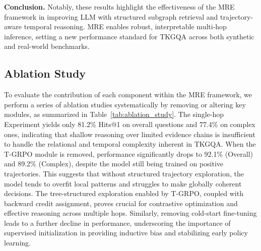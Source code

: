 \documentclass[letterpaper]{article} %
\begin{document}
\noindent\textbf{Conclusion.}
Notably, these results highlight the effectiveness of the MRE framework in improving LLM with structured subgraph retrieval and trajectory-aware temporal reasoning. MRE enables robust, interpretable multi-hop inference, setting a new performance standard for TKGQA across both synthetic and real-world benchmarks.

\subsection{Ablation Study}
\label{subsec:ablation_study}
\begin{table}[h]
\centering
\renewcommand{\arraystretch}{0.95}
\setlength{\tabcolsep}{4pt}
\caption{
Ablation results on \textsc{CRONQUESTIONS}.  
\textit{w/o} indicates removal of the corresponding module from the full MRE pipeline.
}
\label{tab:ablation_study}
\end{table}
To evaluate the contribution of each component within the MRE framework, we perform a series of ablation studies systematically by removing or altering key modules, as summarized in Table~\ref{tab:ablation_study}. The single-hop Experiment yields only 81.2\% Hits@1 on overall questions and 77.4\% on complex ones, indicating that shallow reasoning over limited evidence chains is insufficient to handle the relational and temporal complexity inherent in TKGQA. When the T-GRPO module is removed, performance significantly drops to 92.1\% (Overall) and 89.2\% (Complex), despite the model still being trained on positive trajectories. This suggests that without structured trajectory exploration, the model tends to overfit local patterns and struggles to make globally coherent decisions. The tree-structured exploration enabled by T-GRPO, coupled with backward credit assignment, proves crucial for contrastive optimization and effective reasoning across multiple hops. Similarly, removing cold-start fine-tuning leads to a further decline in performance, underscoring the importance of supervised initialization in providing inductive bias and stabilizing early policy learning. 
\end{document}

